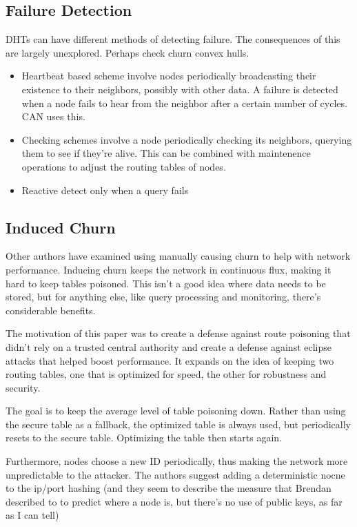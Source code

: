 \documentclass[10pt,letterpaper]{report}
\begin{document}
\subsection{Failure Detection}
DHTs can have different methods of detecting failure.
The consequences of this are largely unexplored.
Perhaps check churn convex hulls.
\begin{itemize}
	\item Heartbeat based scheme involve nodes periodically broadcasting their existence to their neighbors, possibly with other data.  A failure is detected when a node fails to hear from the neighbor after a certain number of cycles.  CAN uses this.
	\item Checking schemes involve a node periodically checking its neighbors, querying them to see if they're alive.  This can be combined with maintenence operations to adjust the routing tables of nodes.
	\item Reactive detect only when a query fails
\end{itemize}

\subsection{Induced Churn}

Other authors have examined using manually causing  churn to help with network performance.
Inducing churn keeps the network in continuous flux, making it hard to keep tables poisoned.   
This isn't a good idea where data needs to be stored, but for anything else, like query processing and monitoring, there's considerable benefits. 

The motivation of this paper was to create a  defense against route poisoning that didn't rely on a trusted central authority and create a defense against eclipse attacks that helped boost performance.  
It expands on the idea of keeping two routing tables, one that is optimized for speed, the other for robustness and security.

The goal is to keep the average level of table poisoning down.  
Rather than using the secure table as a fallback, the optimized table is always used, but periodically resets to the secure table.  
Optimizing the table then starts again.

Furthermore, nodes choose a new ID periodically, thus making the network more unpredictable to the attacker.  
The authors suggest adding a deterministic nocne to the ip/port hashing (and they seem to describe the measure that Brendan described to to predict where a node is, but there's no use of public keys, as far as I can tell)
\end{document}
